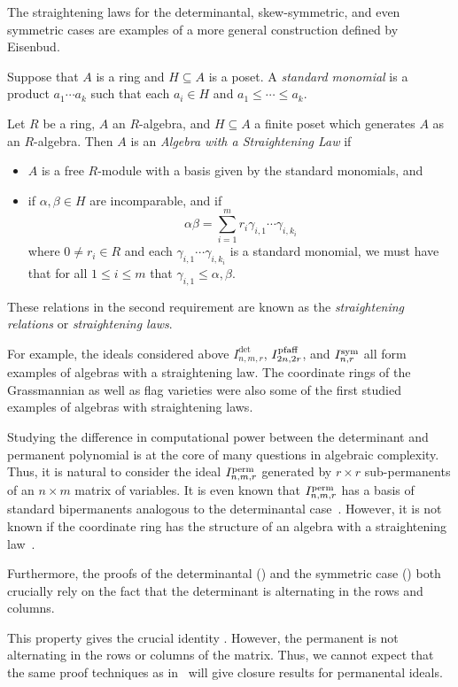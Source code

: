 \documentclass[letterpaper, 11pt]{amsart}
\newif\iffull
\begin{document}
The straightening laws for the determinantal, skew-symmetric, and even symmetric cases are examples of a more general construction defined by Eisenbud.
\begin{defn}
  Suppose that $A$ is a ring and $H \subseteq A$ is a poset.
  A \emph{standard monomial} is a product $a_1 \cdots a_k$ such that each $a_i \in H$ and $a_1 \leq \cdots \leq a_k$.

  Let $R$ be a ring, $A$ an $R$-algebra, and $H \subseteq A$ a finite poset which generates $A$ as an $R$-algebra.
  Then $A$ is an \emph{Algebra with a Straightening Law} if
  \begin{itemize}
  \item $A$ is a free $R$-module with a basis given by the standard monomials, and
  \item if $\alpha, \beta \in H$ are incomparable, and if
        \[
          \alpha \beta = \sum_{i = 1}^m r_i \gamma_{i, 1} \cdots  \gamma_{i, k_i}
        \]
        where $0 \neq r_i \in R$ and each $\gamma_{i, 1} \cdots  \gamma_{i, k_i}$ is a standard monomial, we must have that for all $1 \leq i \leq m$ that $\gamma_{i, 1} \leq \alpha, \beta$.
  \end{itemize}
  These relations in the second requirement are known as the \emph{straightening relations} or \emph{straightening laws}.
\end{defn}
For example, the ideals considered above $I^{\det}_{n, m, r}$, $I^{\operatorname{pfaff}}_{2n, 2r}$, and $I^{\operatorname{sym}}_{n, r}$ all form examples of algebras with a straightening law.
The coordinate rings of the Grassmannian as well as flag varieties were also some of the first studied examples of algebras with straightening laws.

Studying the difference in computational power between the determinant and permanent polynomial is at the core of many questions in algebraic complexity.
Thus, it is natural to consider the ideal $I^{\operatorname{perm}}_{n, m , r}$ generated by $r \times r$ sub-permanents of an $n \times m$ matrix of variables.
It is even known that $I^{\operatorname{perm}}_{n, m ,r}$ has a basis of standard bipermanents analogous to the determinantal case~\cite{Cla82}.
However, it is not known if the coordinate ring has the structure of an algebra with a straightening law~\cite{GN25}.
\iffull
Furthermore, the proofs of \Cref{thrm:main}, \Cref{thrm:pfaff_main}, and even in the symmetric case \Cref{thrm:sym_det_canonical_extraction}, all crucially rely on the fact that the determinant is alternating in the rows and columns.
\else
Furthermore, the proofs of the determinantal () and the symmetric case () both crucially rely on the fact that the determinant is alternating in the rows and columns.
\fi
This property gives the crucial identity .
However, the permanent is not alternating in the rows or columns of the matrix.
Thus, we cannot expect that the same proof techniques as in~\cite{DG25} will give closure results for permanental ideals.
\end{document}
